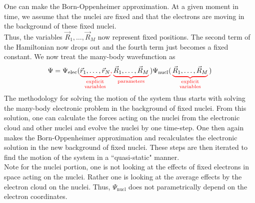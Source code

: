 \documentclass[12pt,a4paper,titlepage]{article}
\newcommand{\trm}[1]{\textrm{#1}} %
\begin{document}
One can make the Born-Oppenheimer approximation. At a given moment in time, we assume that the nuclei are fixed and that the electrons are moving in the background of these fixed nuclei.\\

Thus, the variables $\vec{R}_{1},\ldots,\vec{R}_{M}$ now represent fixed positions. The second term of the Hamiltonian now drops out and the fourth term just becomes a fixed constant. We now treat the many-body wavefunction as
\begin{equation}
\Psi=\Psi_{\trm{elec}}(\color{red}\underbrace{\color{black}\vec{r}_{1},\ldots,\vec{r}_{N}}_{\substack{\trm{explicit}\\\trm{variables}}},\underbrace{\color{black}\vec{R}_{1},\ldots,\vec{R}_{M}}_{\trm{parameters}}{\color{black})\Psi_{\trm{nucl}}(}\underbrace{\color{black}\vec{R}_{1},\ldots,\vec{R}_{M}}_{\substack{\trm{explicit}\\\trm{variables}}}{\color{black})}
\end{equation}
The methodology for solving the motion of the system thus starts with solving the many-body electronic problem in the background of fixed nuclei. From this solution, one can calculate the forces acting on the nuclei from the electronic cloud and other nuclei and evolve the nuclei by one time-step. One then again makes the Born-Oppenheimer approximation and recalculates the electronic solution in the new background of fixed nuclei. These steps are then iterated to find the motion of the system in a ``quasi-static" manner.\\

Note for the nuclei portion, one is not looking at the effects of fixed electrons in space acting on the nuclei. Rather one is looking at the average effects by the electron cloud on the nuclei. Thus, $\Psi_{\trm{nucl}}$ does not parametrically depend on the electron coordinates.\\
\end{document}

